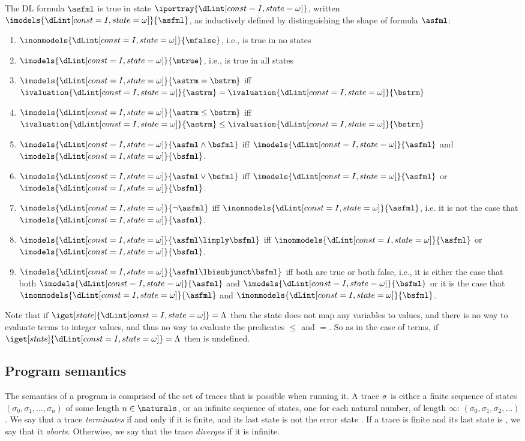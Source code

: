 \documentclass[11pt,twoside]{scrartcl}
\begin{document}
\begin{definition} \label{def:arithmetic-semantics}
The DL formula $\asfml$ is true in state $\iportray{\I}$, written \(\imodels{\I}{\asfml}\), as inductively defined by distinguishing the shape of formula $\asfml$:
\begin{enumerate}
\item \(\inonmodels{\I}{\mfalse}\), i.e., \mfalse is true in no states
\item \(\imodels{\I}{\mtrue}\), i.e., \mtrue is true in all states
\item \(\imodels{\I}{\astrm=\bstrm}\) iff \(\ivaluation{\I}{\astrm}=\ivaluation{\I}{\bstrm}\)
\item \(\imodels{\I}{\astrm\leq\bstrm}\) iff \(\ivaluation{\I}{\astrm}\leq\ivaluation{\I}{\bstrm}\)
\item \(\imodels{\I}{\asfml\land\bsfml}\) iff \(\imodels{\I}{\asfml}\) and \(\imodels{\I}{\bsfml}\).
\item \(\imodels{\I}{\asfml\lor\bsfml}\) iff \(\imodels{\I}{\asfml}\) or \(\imodels{\I}{\bsfml}\).
\item \(\imodels{\I}{\lnot\asfml}\) iff \(\inonmodels{\I}{\asfml}\), i.e. it is not the case that \(\imodels{\I}{\asfml}\).
\item \(\imodels{\I}{\asfml\limply\bsfml}\) iff \(\inonmodels{\I}{\asfml}\) or \(\imodels{\I}{\bsfml}\).
\item \(\imodels{\I}{\asfml\lbisubjunct\bsfml}\) iff both are true or both false, i.e., it is either the case that both \(\imodels{\I}{\asfml}\) and \(\imodels{\I}{\bsfml}\) or it is the case that \(\inonmodels{\I}{\asfml}\) and \(\inonmodels{\I}{\bsfml}\).
\end{enumerate}
Note that if $\iget[state]{\I} = \errstate$ then the state does not map any variables to values, and there is no way to evaluate terms to integer values, and thus no way to evaluate the predicates $\le$ and $=$. So as in the case of terms, if $\iget[state]{\I} = \errstate$ then \m{\imodels{\I}{\ausfml}} is undefined.
\end{definition}

\subsection{Program semantics}

The semantics of a program is comprised of the set of traces that is possible when running it. A trace $\sigma$ is either a finite sequence of states $(\sigma_0, \sigma_1, \ldots, \sigma_n)$ of some length $n \in \naturals$, or an infinite sequence of states, one for each natural number, of length $\infty$: $(\sigma_0, \sigma_1, \sigma_2, \ldots)$. We say that a trace \emph{terminates} if and only if it is finite, and its last state is not the error state \errstate. If a trace is finite and its last state is \errstate, we say that it \emph{aborts}. Otherwise, we say that the trace \emph{diverges} if it is infinite.
\end{document}
